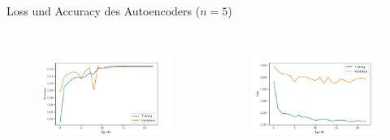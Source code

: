   \begin{frame}{Loss und Accuracy des Autoencoders ($n = 5$)}
    \begin{columns}[c]
      \begin{figure}
        \centering
        \includegraphics[width=\textwidth]{logos/RF/history_acc_rf.pdf}
        \label{fig:acc_rf}
      \end{figure}
      \begin{figure}
        \centering
        \includegraphics[width=\textwidth]{logos/RF/history_loss_rf.pdf}
        \label{fig:loss_rf}
      \end{figure}
    \end{columns}
  \end{frame}

